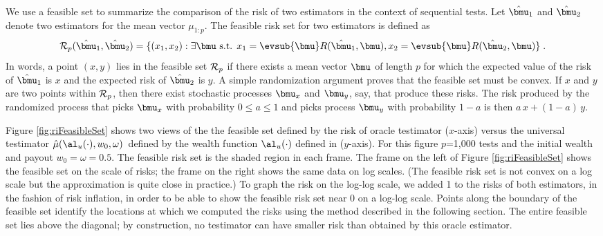 \documentclass[12pt]{article}
\newcommand{\uTest}{\mbox{$\hat\mu(\al_u(\cdot),w_0,\omega)$}}
\begin{document}
 We use a feasible set to summarize the comparison of the risk of two estimators
 in the context of sequential tests.  Let $\hat{\bmu}_1$ and $\hat{\bmu}_2$
 denote two estimators for the mean vector $\mu_{1:p}$.  The feasible risk set
 for two estimators is defined as
 \begin{equation}
     {\cal R}_p(\hat{\bmu}_1,\hat{\bmu}_2) = 
      \{(x_1,x_2): \exists \bmu \mbox{ s.t. }
          x_1 = \evsub{\bmu} R(\hat{\bmu}_1,\bmu),
          x_2 = \evsub{\bmu} R(\hat{\bmu}_2,\bmu)  \} \;.           
 \label{eq:feasibleSet}
 \end{equation}
 In words, a point $(x,y)$ lies in the feasible set ${\cal R}_p$ if there exists
 a mean vector $\bmu$ of length $p$ for which the expected value of the risk of
 $\hat{\bmu}_1$ is $x$ and the expected risk of $\hat{\bmu}_2$ is $y$.  A simple
 randomization argument proves that the feasible set must be convex.  If $x$ and
 $y$ are two points within ${\cal R}_p$, then there exist stochastic processes
 $\bmu_x$ and $\bmu_y$, say, that produce these risks.  The risk produced by the
 randomized process that picks $\bmu_x$ with probability $0 \le a \le 1$ and
 picks process $\bmu_y$ with probability $1-a$ is then $a\,x+(1-a)\,y$.


 Figure \ref{fig:riFeasibleSet} shows two views of the the feasible set defined
 by the risk of oracle testimator ($x$-axis) versus the universal testimator
 \uTest\ defined by the wealth function $\al_u(\cdot)$ defined in 
 ($y$-axis).  For this figure $p$=1,000 tests and the initial wealth and payout
 $w_0 = \omega = 0.5$.  The feasible risk set is the shaded region in each
 frame.  The frame on the left of Figure \ref{fig:riFeasibleSet} shows the
 feasible set on the scale of risks; the frame on the right shows the same data
 on log scales.  (The feasible risk set is not convex on a log scale but the
 approximation is quite close in practice.) To graph the risk on the log-log
 scale, we added 1 to the risks of both estimators, in the fashion of risk
 inflation, in order to be able to show the feasible risk set near 0 on a
 log-log scale.  Points along the boundary of the feasible set identify the
 locations at which we computed the risks using the method described in the
 following section.  The entire feasible set lies above the diagonal; by
 construction, no testimator can have smaller risk than obtained by this oracle
 estimator.  
\end{document}
